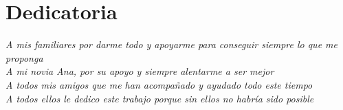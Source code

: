 %
%



\chapter*{Dedicatoria}

\begin{center}
\textit{A mis familiares por darme todo y apoyarme para conseguir siempre lo que me proponga\\[1em]
A mi novia Ana, por su apoyo y siempre alentarme a ser mejor\\ [1em]
A todos mis amigos que me han acompañado y ayudado todo este tiempo\\[1em]
A todos ellos le dedico este trabajo porque sin ellos no habría sido posible}

\end{center}